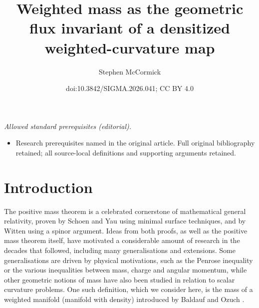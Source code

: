 \documentclass[10pt,a4paper]{amsart}
\title{Weighted mass as the geometric flux invariant of a densitized weighted-curvature map}
\author{Stephen McCormick}
\date{doi:10.3842/SIGMA.2026.041; CC BY 4.0}
\numberwithin{equation}{section}
\theoremstyle{definition}
\begin{document}
\maketitle
\noindent\textit{Allowed standard prerequisites (editorial).}\begin{itemize}
\item Research prerequisites named in the original article. Full original bibliography retained; all source-local definitions and supporting arguments retained.
\end{itemize}\medskip
\section{Introduction}
The positive mass theorem is a celebrated cornerstone of mathematical general relativity, proven by Schoen and Yau \cite{SchoenYau79} using minimal surface techniques, and by Witten \cite{Witten81} using a spinor argument. Ideas from both proofs, as well as the positive mass theorem itself, have motivated a considerable amount of research in the decades that followed, including many generalisations and extensions. Some generalisations are driven by physical motivations, such as the Penrose inequality or the various inequalities between mass, charge and angular momentum, while other geometric notions of mass have also been studied in relation to scalar curvature problems. One such definition, which we consider here, is the mass of a weighted manifold (manifold with density) introduced by Baldauf and Ozuch \cite{BaldaufOzuch22}.
\end{document}
